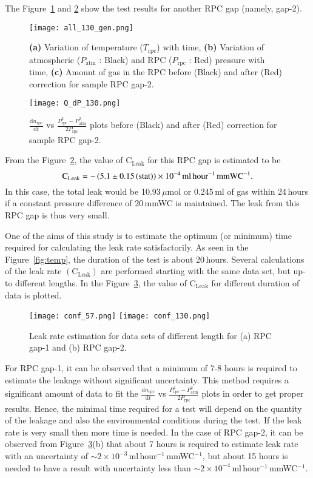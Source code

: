 The Figure~\ref{fig:with1} and \ref{fig:qt1} show the test results for another
RPC gap (namely, gap-2).
\begin{figure}
  \centering
  \texttt{[image: all\_130\_gen.png]}
  \caption{\textbf{(a)} Variation of temperature ($T_{\textrm{rpc}}$) with time,
    \textbf{(b)} Variation of atmospheric ($P_{\textrm{atm}}$ : Black) and RPC
    ($P_{\textrm{rpc}}$ : Red) pressure with time, \textbf{(c)} Amount of gas in
    the RPC before (Black) and after (Red) correction for sample RPC gap-2.}
  \label{fig:with1}
\end{figure}
\begin{figure}
  \centering
  \texttt{[image: Q\_dP\_130.png]}
  \caption{$\frac{\mathrm{d}n_{\textrm{rpc}}}{\mathrm{d}t}$ vs
    $\frac{P_{\textrm{rpc}}^{2}-P_{\textrm{atm}}^{2}}{2P_{\textrm{rpc}}}$ plots before
    (Black) and after (Red) correction for sample RPC gap-2.}
  \label{fig:qt1}
\end{figure}
From the Figure~\ref{fig:qt1}, the value of $\textrm{C}_{\textrm{Leak}}$ for this
RPC gap is estimated to be
\[\textrm{C}_{\textrm{Leak}}=-\left(5.1\pm 0.15\left(\textrm{stat}\right)\right)\times 10^{-4}\textrm{\,ml\,hour$^{-1}$\,mmWC$^{-1}$}.\]
In this case, the total leak would be 10.93\,$\mu$mol or 0.245\,ml of gas
within 24\,hours if a constant pressure difference of 20\,mmWC is maintained.
The leak from this RPC gap is thus very small.

One of the aims of this study is to estimate the optimum (or minimum) time
required for calculating the leak rate satisfactorily. As seen in the
Figure~\ref{fig:temp}, the duration of the test is about 20\,hours. Several
calculations of the leak rate $\left(\textrm{C}_{\textrm{Leak}}\right)$ are
performed starting with the same data set, but up-to different lengths. In the
Figure~\ref{fig:time}, the value of $\textrm{C}_{\textrm{Leak}}$ for different
duration of data is plotted.
\begin{figure}
  \centering
  \texttt{[image: conf\_57.png]}
  \vspace*{10pt}
  \texttt{[image: conf\_130.png]}
  \caption{Leak rate estimation for data sets of different length for
    (a) RPC gap-1 and (b) RPC gap-2.}
  \label{fig:time}
\end{figure}
For RPC gap-1, it can be observed that a minimum of 7-8 hours is required to
estimate the leakage without significant uncertainty. This method requires a
significant amount of data to fit the
$\frac{\mathrm{d}n_{\textrm{rpc}}}{\mathrm{d}t}$ vs
$\frac{P_{\textrm{rpc}}^{2}-P_{\textrm{atm}}^{2}}{2P_{\textrm{rpc}}}$ plots in order to
get proper results. Hence, the minimal time required for a test will depend on
the quantity of the leakage and also the environmental conditions during the
test. If the leak rate is very small then more time is needed. In the case of
RPC gap-2, it can be observed from Figure~\ref{fig:time}(b) that about 7 hours
is required to estimate leak rate with an uncertainty of
$\sim 2\times 10^{-3}$\,ml\,hour$^{-1}$\,mmWC$^{-1}$, but about 15 hours is
needed to have a result with uncertainty less than
$\sim 2\times 10^{-4}$\,ml\,hour$^{-1}$\,mmWC$^{-1}$.

